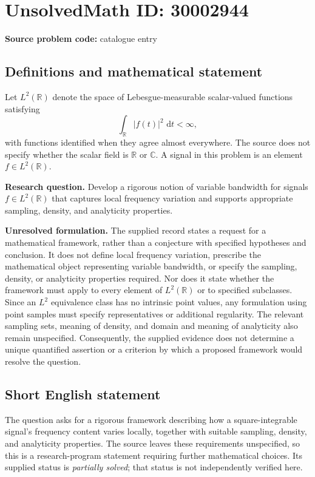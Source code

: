 \documentclass[11pt]{article}
\newcommand{\R}{\mathbb{R}}
\newcommand{\C}{\mathbb{C}}
\newcommand{\dd}{\,\mathrm{d}}
\begin{document}
\section*{UnsolvedMath ID: 30002944}
\textbf{Source problem code:} catalogue entry
\subsection{Definitions and mathematical statement}
Let \(L^2(\R)\) denote the space of Lebesgue-measurable scalar-valued functions satisfying
\[
\int_{\R}|f(t)|^2\,\dd t<\infty,
\]
with functions identified when they agree almost everywhere. The source does not specify whether the scalar field is \(\R\) or \(\C\). A signal in this problem is an element \(f\in L^2(\R)\).

\textbf{Research question.} Develop a rigorous notion of variable bandwidth for signals \(f\in L^2(\R)\) that captures local frequency variation and supports appropriate sampling, density, and analyticity properties.

\textbf{Unresolved formulation.} The supplied record states a request for a mathematical framework, rather than a conjecture with specified hypotheses and conclusion. It does not define local frequency variation, prescribe the mathematical object representing variable bandwidth, or specify the sampling, density, or analyticity properties required. Nor does it state whether the framework must apply to every element of \(L^2(\R)\) or to specified subclasses. Since an \(L^2\) equivalence class has no intrinsic point values, any formulation using point samples must specify representatives or additional regularity. The relevant sampling sets, meaning of density, and domain and meaning of analyticity also remain unspecified. Consequently, the supplied evidence does not determine a unique quantified assertion or a criterion by which a proposed framework would resolve the question.
\subsection{Short English statement}
The question asks for a rigorous framework describing how a square-integrable signal's frequency content varies locally, together with suitable sampling, density, and analyticity properties. The source leaves these requirements unspecified, so this is a research-program statement requiring further mathematical choices. Its supplied status is \emph{partially solved}; that status is not independently verified here.
\end{document}

